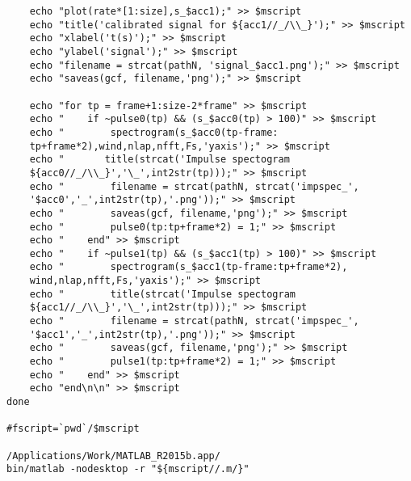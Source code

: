 \documentclass{sigchi}
\begin{document}
\begin{lstlisting}
	echo "plot(rate*[1:size],s_$acc1);" >> $mscript
	echo "title('calibrated signal for ${acc1//_/\\_}');" >> $mscript
	echo "xlabel('t(s)');" >> $mscript
	echo "ylabel('signal');" >> $mscript
	echo "filename = strcat(pathN, 'signal_$acc1.png');" >> $mscript
	echo "saveas(gcf, filename,'png');" >> $mscript

	echo "for tp = frame+1:size-2*frame" >> $mscript
	echo "    if ~pulse0(tp) && (s_$acc0(tp) > 100)" >> $mscript
	echo "        spectrogram(s_$acc0(tp-frame:
    tp+frame*2),wind,nlap,nfft,Fs,'yaxis');" >> $mscript
 	echo "       title(strcat('Impulse spectogram 
    ${acc0//_/\\_}','\_',int2str(tp)));" >> $mscript
	echo "        filename = strcat(pathN, strcat('impspec_',
    '$acc0','_',int2str(tp),'.png'));" >> $mscript
	echo "        saveas(gcf, filename,'png');" >> $mscript
	echo "        pulse0(tp:tp+frame*2) = 1;" >> $mscript
	echo "    end" >> $mscript
	echo "    if ~pulse1(tp) && (s_$acc1(tp) > 100)" >> $mscript
	echo "        spectrogram(s_$acc1(tp-frame:tp+frame*2),
    wind,nlap,nfft,Fs,'yaxis');" >> $mscript
	echo "        title(strcat('Impulse spectogram 
    ${acc1//_/\\_}','\_',int2str(tp)));" >> $mscript
	echo "        filename = strcat(pathN, strcat('impspec_',
    '$acc1','_',int2str(tp),'.png'));" >> $mscript
	echo "        saveas(gcf, filename,'png');" >> $mscript
	echo "        pulse1(tp:tp+frame*2) = 1;" >> $mscript
	echo "    end" >> $mscript
	echo "end\n\n" >> $mscript
done

#fscript=`pwd`/$mscript

/Applications/Work/MATLAB_R2015b.app/
bin/matlab -nodesktop -r "${mscript//.m/}"
\end{lstlisting}
\end{document}
